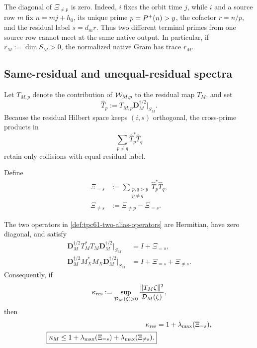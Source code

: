 The diagonal of \(\Xi_{\ne p}\) is zero.  Indeed, \(i\) fixes the orbit
time \(j\), while \(i\) and a source row \(m\) fix
\(n=mj+h_0\), its unique prime \(p=P^{+}(n)>y\), the cofactor \(r=n/p\),
and the residual label \(s=d_mr\).  Thus two different terminal primes
from one source row cannot meet at the same native output.  In particular,
if \(r_M:=\dim S_M>0\), the normalized native Gram has trace \(r_M\).

\subsection{Same-residual and unequal-residual spectra}

Let \(T_{M,p}\) denote the contribution of \(\mathcal W_{M,p}\) to the residual
map \(T_M\), and set
\begin{equation}
 \widehat T_p
 :=T_{M,p}\mathbf D_M^{\dagger/2}|_{S_M}.
 \label{eq:tpc61-normalized-residual-prime-map}
\end{equation}
Because the residual Hilbert space keeps \((i,s)\) orthogonal, the
cross-prime products in
\[
 \sum_{p\ne q}\widehat T_p^*\widehat T_q
\]
retain only collisions with equal residual label.

\begin{definition}
\label{def:tpc61-two-alias-operators}
Define
\begin{align}
 \Xi_{=s}
 &:=\sum_{\substack{p,q>y\\p\ne q}}
       \widehat T_p^*\widehat T_q,
 \label{eq:tpc61-same-residual-alias}\\
 \Xi_{\ne s}
 &:=\Xi_{\ne p}-\Xi_{=s}.
 \label{eq:tpc61-unequal-residual-alias}
\end{align}
\end{definition}

\begin{theorem}
\label{thm:tpc61-residual-native-split}
The two operators in
\cref{def:tpc61-two-alias-operators} are Hermitian, have zero diagonal,
and satisfy
\begin{align}
 \mathbf D_M^{\dagger/2}T_M^*T_M
 \mathbf D_M^{\dagger/2}\big|_{S_M}
 &=I+\Xi_{=s},
 \label{eq:tpc61-residual-normalized-gram}\\
 \mathbf D_M^{\dagger/2}M_X^*M_X
 \mathbf D_M^{\dagger/2}\big|_{S_M}
 &=I+\Xi_{=s}+\Xi_{\ne s}.
 \label{eq:tpc61-native-normalized-gram-split}
\end{align}
Consequently, if
\begin{equation}
 \kappa_{\rm res}
 :=\sup_{\mathcal D_M(\zeta)>0}
 \frac{\|T_M\zeta\|^2}{\mathcal D_M(\zeta)},
 \label{eq:tpc61-residual-effective-degree}
\end{equation}
then
\begin{align}
 \kappa_{\rm res}
 &=1+\lambda_{\max}(\Xi_{=s}),
 \label{eq:tpc61-residual-positive-spectrum}\\
 \boxed{
 \kappa_M
 \le1+\lambda_{\max}(\Xi_{=s})
       +\lambda_{\max}(\Xi_{\ne s}).}
 \label{eq:tpc61-two-positive-spectrum-bound}
\end{align}
\end{theorem}


